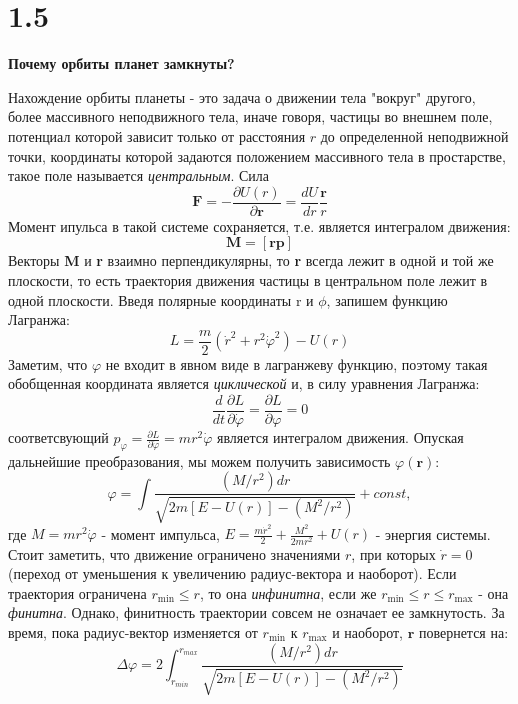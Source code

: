 \documentclass[a4paper,14pt]{article}
\begin{document}
\section*{1.5}
\begin{center}
	\LARGE{\textbf{Почему орбиты планет замкнуты?}}\\
\end{center}

Нахождение орбиты планеты - это задача о движении тела "вокруг" другого, более массивного неподвижного тела, иначе говоря, частицы во внешнем поле, потенциал которой зависит только от расстояния $r$ до определенной неподвижной точки, координаты которой задаются положением массивного тела в простарстве, такое поле называется \textit{центральным}. Сила
\begin{equation}\label{eq1}
\textbf{F} = -\frac{\partial U(r)}{\partial\textbf{r}} = \frac{dU}{dr} \frac{\textbf{r}}{r}
\end{equation}  
Момент ипульса в такой системе сохраняется, т.е. является интегралом движения:
\begin{equation}\label{eq2}
\textbf{M} = [\textbf{rp}]
\end{equation}
Векторы \textbf{M} и \textbf{r} взаимно перпендикулярны, то \textbf{r} всегда лежит в одной и той же плоскости, то есть траектория движения частицы в центральном поле лежит в одной плоскости.
Введя полярные координаты r и $\phi$, запишем функцию Лагранжа:
\begin{equation}\label{eq3}
L = \frac{m}{2}\left(\dot{r}^2 + r^2 \dot{\varphi}^2\right) - U(r)
\end{equation}
Заметим, что $\varphi$ не входит в явном виде в лагранжеву функцию, поэтому такая обобщенная координата является \textit{циклической} и, в силу уравнения Лагранжа:
\begin{equation}\label{eq4}
\frac{d}{dt} \frac{\partial L}{\partial \dot{\varphi}} = \frac{\partial L}{\partial \varphi} = 0
\end{equation} 
 соответсвующий $p_\varphi = \frac{\partial L}{\partial \dot{\varphi}}= mr^2\dot{\varphi}$ является интегралом движения. Опуская дальнейшие преобразования, мы можем получить зависимость $\varphi(\textbf{r})$:
\begin{equation}\label{eq5}
\varphi = \int \frac{(M/r^2)dr}{\sqrt{2m[E-U(r)] - (M^2/r^2)}} + const,
\end{equation}
где $M = mr^2\dot{\varphi}$ - момент импульса, $E = \frac{m\dot{r}^2}{2} + \frac{M^2}{2mr^2} + U(r)$ - энергия системы.
Стоит заметить, что движение ограничено значениями $r$, при которых $\dot{r} = 0$ (переход от уменьшения к увеличению радиус-вектора и наоборот). Если траектория ограничена $r_\text{min} \leq r$, то она \textit{инфинитна}, если же $r_\text{min} \leq r \leq r_\text{max}$ - она \textit{финитна}. Однако, финитность траектории совсем не означает ее замкнутость. За время, пока радиус-вектор изменяется от $r_\text{min}$ к $r_\text{max}$ и наоборот, $\textbf{r}$ повернется на:
\begin{equation}\label{eq6}
\Delta \varphi = 2 \int_{r_{min}}^{r_{max}} \frac{(M/r^2)dr}{\sqrt{2m[E-U(r)] - (M^2/r^2)}}  
\end{equation}
\end{document}

